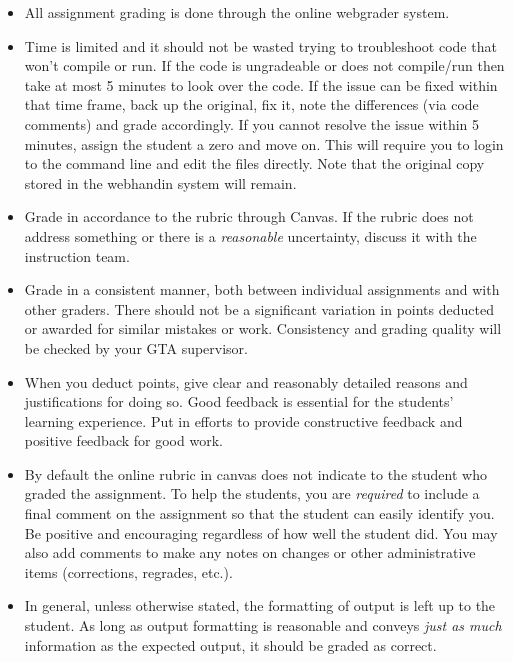 \documentclass[12pt]{scrartcl}
\begin{document}
\begin{itemize}
  \item All assignment grading is done through the online webgrader system.  
  \item Time is limited and it should not be wasted trying to troubleshoot 
    code that won't compile or run.  If the code is ungradeable or does not
    compile/run then take at most 5 minutes to look over
    the code.  If the issue can be fixed within that time frame, back up the
    original, fix it, note the differences (via code comments) and grade 
    accordingly.  If you cannot resolve the issue within 5 minutes, assign
    the student a zero and move on.  This will require you to login to the
    command line and edit the files directly.  Note that the original copy
    stored in the webhandin system will remain.
  \item Grade in accordance to the rubric through Canvas.  If the rubric 
    does not address something or there is a \emph{reasonable} uncertainty, 
    discuss it with the instruction team.
  \item Grade in a consistent manner, both between individual assignments and
    with other graders.  There should not be a significant variation in
    points deducted or awarded for similar mistakes or work.  Consistency 
    and grading quality will be checked by your GTA supervisor.
  \item When you deduct points, give clear and reasonably detailed reasons
    and justifications for doing so.  Good feedback is essential for the
    students' learning experience.  Put in efforts to provide constructive
    feedback and positive feedback for good work.
  \item By default the online rubric in canvas does not indicate to the
    student who graded the assignment.  To help the students, you are 
    \emph{required} to include a final comment on the assignment so 
    that the student can easily identify you.  Be positive and encouraging
    regardless of how well the student did.  You may also add comments to
    make any notes on changes or other administrative items (corrections, 
    regrades, etc.).
  \item In general, unless otherwise stated, the formatting of output is
    left up to the student.  As long as output formatting is reasonable and
    conveys \emph{just as much} information as the expected output, it should
    be graded as correct.
\end{itemize}
\end{document}

